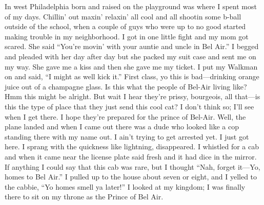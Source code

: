 In west Philadelphia born and raised on the playground was where I spent most of my days.
Chillin' out maxin' relaxin' all cool and all shootin some b-ball outside of the school,
when a couple of guys who were up to no good started making trouble in my neighborhood.
I got in one little fight and my mom got scared.
She said ``You're movin' with your auntie and uncle in Bel Air.''
I begged and pleaded with her day after day but she packed my suit case and sent me on my way.
She gave me a kiss and then she gave me my ticket.
I put my Walkman on and said, ``I might as well kick it.''
First class, yo this is bad---drinking orange juice out of a champagne glass.
Is this what the people of Bel-Air living like?
Hmm this might be alright.
But wait I hear they're prissy, bourgeois, all that---is this the type of place that they just send this cool cat?
I don't think so; I'll see when I get there.
I hope they're prepared for the prince of Bel-Air.
Well, the plane landed and when I came out there was a dude who looked like a cop standing there with my name out.
I ain't trying to get arrested yet.
I just got here.
I sprang with the quickness like lightning, disappeared.
I whistled for a cab and when it came near the license plate said fresh and it had dice in the mirror.
If anything I could say that this cab was rare, but I thought ``Nah, forget it---Yo, homes to Bel Air.''
I pulled up to the house about seven or eight, and I yelled to the cabbie, ``Yo homes smell ya later!''
I looked at my kingdom; I was finally there to sit on my throne as the Prince of Bel Air.
